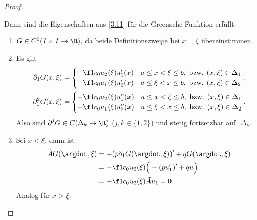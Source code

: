 \begin{st}
\begin{proof}
\begin{seg}[(ii)$\implies$(i)]
\begin{itemize}
					Dann sind die Eigenschaften aus \ref{3.11} für die Greensche Funktion erfüllt:
					\begin{enumerate}[1)]
						\item
							$G \in C^0(I \times I \to \R)$, da beide Definitionszweige bei $x = \xi$ übereinstimmen.
						\item
							Es gilt
							\begin{align*}
								\partial_1 G(x,\xi) &= \begin{cases}
									-\f 1{c_0} u_2(\xi) u_1'(x) & a \le x < \xi \le b, \text{ bzw. $(x,\xi) \in \Delta_1$} \\
									-\f 1{c_0} u_1(\xi) u_2'(x) & a \le \xi < x \le b, \text{ bzw. $(x,\xi) \in \Delta_2$} 
								\end{cases}, \\
								\partial_1^2 G(x,\xi) &= \begin{cases}
									-\f 1{c_0} u_2(\xi) u_1''(x) & a \le x < \xi \le b, \text{ bzw. $(x,\xi) \in \Delta_1$} \\
									-\f 1{c_0} u_1(\xi) u_2''(x) & a \le \xi < x \le b, \text{ bzw. $(x,\xi) \in \Delta_2$} 
								\end{cases}.
							\end{align*}
							Also sind $\partial_1^j G \in C(\Delta_k \to \R)$ ($j,k\in \{1,2\}$) und stetig fortsetzbar auf $\_{\Delta_k}$.
						\item
							Sei $x < \xi$, dann ist
							\begin{align*}
								\tilde A G(\argdot, \xi) 
								&= -(p\partial_1 G(\argdot, \xi))' + qG(\argdot, \xi)  \\
								&= - \f 1{c_0} u_2(\xi) \Big( - (pu_1')' + qu \Big) \\
								&= - \f 1{c_0} u_2(\xi) \tilde A u_1 
								= 0.
							\end{align*}
							Analog für $x > \xi$.


\end{enumerate}
\end{itemize}
\end{seg}
\end{proof}
\end{st}
